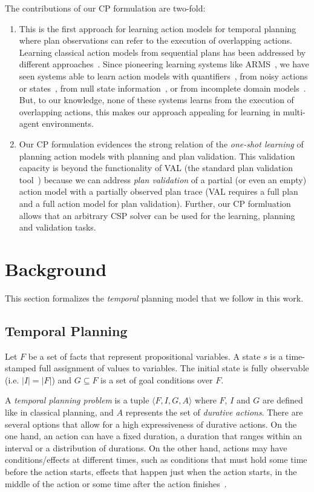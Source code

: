 \documentclass{ecai}
\newcommand{\tup}[1]{{\langle #1 \rangle}}
\begin{document}
The contributions of our CP formulation are two-fold:
\begin{enumerate}  
\item This is the first approach for learning action models for temporal planning where plan observations can refer to the execution of overlapping actions. Learning classical action models from sequential plans has been addressed by different approaches~\cite{arora2018review}. Since pioneering learning systems like ARMS~\cite{yang2007learning}, we have seen systems able to learn action models with quantifiers~\cite{AmirC08,ZhuoYHL10}, from noisy actions or states~\cite{MouraoZPS12,zhuo2013action}, from null state information~\cite{cresswell2013}, or from incomplete domain models~\cite{ZhuoK17,ZhuoNK13}. But, to our knowledge, none of these systems learns from the execution of overlapping actions, this makes our approach appealing for learning in multi-agent environments.
\item Our CP formulation evidences the strong relation of the {\em one-shot learning} of planning action models with planning and plan validation. This validation capacity is beyond the functionality of VAL (the standard plan validation tool~\cite{howey2004val}) because we can address {\em plan validation} of a partial (or even an empty) action model with a partially observed plan trace (VAL requires a full plan and a full action model for plan validation). Further, our CP formluation allows that an arbitrary CSP solver can be used for the learning, planning and validation tasks.  
\end{enumerate}



\section{Background}
This section formalizes the {\em temporal} planning model that we follow in this work.

\subsection{Temporal Planning}
\label{sec:temporalplanning}

Let $F$ be a set of facts that represent propositional variables. A state $s$ is a time-stamped full assignment of values to variables. The initial state is fully observable (i.e. $|I|=|F|$) and $G \subseteq F$ is a set of goal conditions over $F$.

A {\em temporal planning problem} is a tuple $\tup{F,I,G,A}$ where $F$, $I$ and $G$ are defined like in classical planning, and $A$ represents the set of {\em durative actions}. There are several options that allow for a high expressiveness of durative actions. On the one hand, an action can have a fixed duration, a duration that ranges within an interval or a distribution of durations. On the other hand, actions may have conditions/effects at different times, such as conditions that must hold some time before the action starts, effects that happen just when the action starts, in the middle of the action or some time after the action finishes~\cite{garrido2009constraint}.
\end{document}
